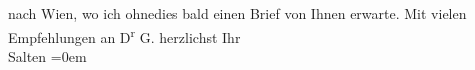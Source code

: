 \begin{ledgroupsized}[t]{13cm}
               nach Wien, wo
               ich ohnedies bald einen Brief von Ihnen erwarte. \pend
           \pstart
           Mit vielen Empfehlungen an D\textsuperscript{r}{ }G. herzlichst \pend
           \pstart
           Ihr {\\[\baselineskip]}\spacefill\mbox{Salten}\pend
           \leftskip=0em{}
         
         \endnumbering{}\end{ledgroupsized}\begin{anhang}\end{anhang}\newcommand{\dateiname}{L03164}\newcommand{\titel}{Felix Salten an Arthur Schnitzler, 30. 8. 1895}\newcommand{\editorInnen}{Martin Anton Müller und Laura Untner}
      